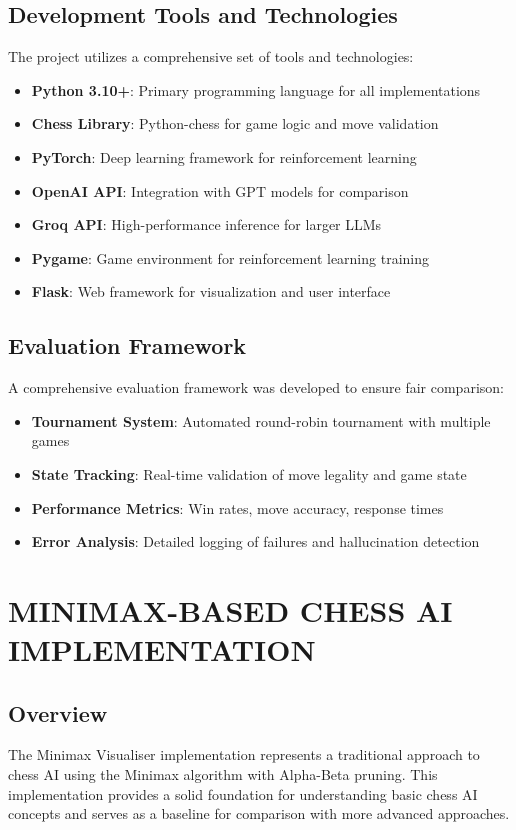 \documentclass[11pt,a4paper]{report}
\begin{document}
\section{Development Tools and Technologies}
The project utilizes a comprehensive set of tools and technologies:

\begin{itemize}
    \item \textbf{Python 3.10+}: Primary programming language for all implementations
    \item \textbf{Chess Library}: Python-chess for game logic and move validation
    \item \textbf{PyTorch}: Deep learning framework for reinforcement learning
    \item \textbf{OpenAI API}: Integration with GPT models for comparison
    \item \textbf{Groq API}: High-performance inference for larger LLMs
    \item \textbf{Pygame}: Game environment for reinforcement learning training
    \item \textbf{Flask}: Web framework for visualization and user interface
\end{itemize}

\section{Evaluation Framework}
A comprehensive evaluation framework was developed to ensure fair comparison:

\begin{itemize}
    \item \textbf{Tournament System}: Automated round-robin tournament with multiple games
    \item \textbf{State Tracking}: Real-time validation of move legality and game state
    \item \textbf{Performance Metrics}: Win rates, move accuracy, response times
    \item \textbf{Error Analysis}: Detailed logging of failures and hallucination detection
\end{itemize}

\chapter{MINIMAX-BASED CHESS AI IMPLEMENTATION}
\thispagestyle{fancy}

\section{Overview}
The Minimax Visualiser implementation represents a traditional approach to chess AI using the Minimax algorithm with Alpha-Beta pruning. This implementation provides a solid foundation for understanding basic chess AI concepts and serves as a baseline for comparison with more advanced approaches.
\end{document}
